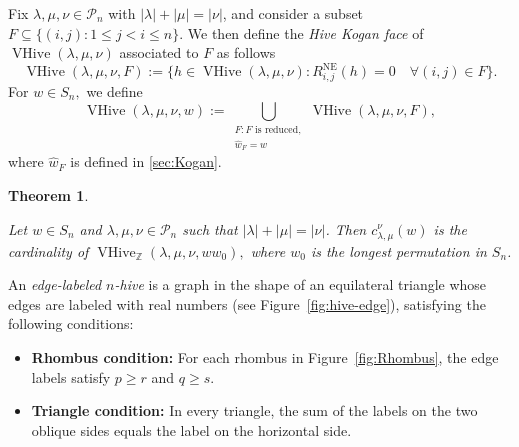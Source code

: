 \documentclass[11pt,reqno]{amsart}
\newcommand\Par{\mathscr{P}}
\newtheorem{theorem}{Theorem}
\DeclareMathOperator{\VHive}{VHive}
\DeclareMathOperator{\NE}{NE}
\begin{document}
Fix $\lambda,\mu,\nu \in \Par_n $ with $|\lambda| + |\mu| = |\nu|$, and consider a subset $F \subseteq \{(i,j): 1 \leq j < i \leq n \} $. We then define the {\em Hive Kogan face} \cite[\S5.3]{Mrigendra:saturation} of $ \VHive(\lambda,\mu,\nu)$ associated to $F$ as follows
\begin{equation}
    \label{eq:hive-kogan}
\VHive(\lambda,\mu,\nu,F):=\{ h \in \VHive(\lambda,\mu,\nu): R^{\NE}_{i,j}(h)=0 \quad \forall (i,j) \in F \}.
\end{equation}
For $w \in S_n,$ we define
$$\VHive(\lambda,\mu,\nu,w):= \bigcup_{\substack{F: F \text{ is reduced},\\ \hat{w}_F=w}} \VHive(\lambda,\mu,\nu,F),$$
where $\hat{w}_F$ is defined in \ref{sec:Kogan}.
\begin{theorem}
\begin{upshape}
 \cite[Theorem 5.4]{Mrigendra:saturation}   
\end{upshape}
 Let $w \in S_n$ and $\lambda,\mu,\nu \in \Par_n$ such that $|\lambda|+|\mu|=|\nu|$. Then $c_{\lambda,\mu}^{\nu}(w)$ is the cardinality of $\VHive_{\mathbb{Z}}(\lambda,\mu,\nu,ww_0),$ where $w_0$ is the longest permutation in $S_n$.   
\end{theorem}
An {\em edge-labeled $n$-hive} is a graph in the shape of an equilateral triangle whose edges are labeled with real numbers (see Figure~\ref{fig:hive-edge}), satisfying the following conditions:
\begin{itemize}
    \item \textbf{Rhombus condition:} For each rhombus in Figure~\ref{fig:Rhombus}, the edge labels satisfy $p \geq r $ and $ q \geq s$.
    \item \textbf{Triangle condition:} In every triangle, the sum of the labels on the two oblique sides equals the label on the horizontal side.
\end{itemize}
\end{document}
